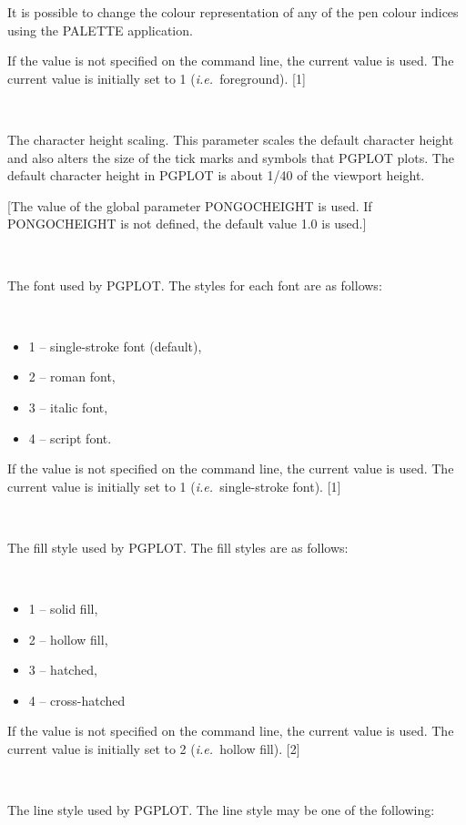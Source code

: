 \documentclass[twoside,11pt]{article}
\renewcommand{\_}{\texttt{\symbol{95}}}
\newcommand{\ie}{{\em i.e.\ }}
\newcommand{\sstsubsection}[1]{ \item[{#1}] \mbox{} \\}
\newcommand{\sstitemlist}[1]{
  \mbox{} \\
  \vspace{-3.5ex}
  \begin{itemize}
     #1
  \end{itemize}
}
\newcommand{\sstitem}{\item}
\newcommand{\sstsubsection}[1]{\item[{#1}]}
\newcommand{\sstitemlist}[1]{
      \begin{itemize}
         #1
      \end{itemize}
      \\
   }
\newcommand{\sstitem}{\item}
\begin{document}
{{{{         }
         It is possible to change the colour representation of any of
         the pen colour indices using the PALETTE application.

         If the value is not specified on the command line, the current
         value is used. The current value is initially set to 1 
         (\ie foreground).
         [1]
      }
      \sstsubsection{
         CHEIGHT = \_REAL (Read and Write)
      }{
         The character height scaling. This parameter scales the
         default character height and also alters the size of the tick
         marks and symbols that PGPLOT plots. The default character
         height in PGPLOT is about 1/40 of the viewport height.

         [The value of the global parameter PONGO\_CHEIGHT is used. If
         PONGO\_CHEIGHT is not defined, the default value 1.0 is used.]
      }
      \sstsubsection{
         FONT = \_INTEGER (Read)
      }{
         The font used by PGPLOT. The styles for each font are as
         follows:

         \sstitemlist{

            \sstitem
               1 -- single-stroke font (default),

            \sstitem
               2 -- roman font,

            \sstitem
               3 -- italic font,

            \sstitem
               4 -- script font.

         }
         If the value is not specified on the command line, the current
         value is used. The current value is initially set to 1 
         (\ie single-stroke font).
         [1]
      }
      \sstsubsection{
         FILLSTY = \_INTEGER (Read)
      }{
         The fill style used by PGPLOT. The fill styles are as follows:

         \sstitemlist{

            \sstitem
               1 -- solid fill,

            \sstitem
               2 -- hollow fill,

            \sstitem
               3 -- hatched,

            \sstitem
               4 -- cross-hatched

         }
         If the value is not specified on the command line, the current
         value is used. The current value is initially set to 2 
         (\ie hollow fill).
         [2]
      }
      \sstsubsection{
         LINESTY = \_INTEGER (Read)
      }{
         The line style used by PGPLOT.  The line style may be one of
         the following:

}}}
\end{document}
